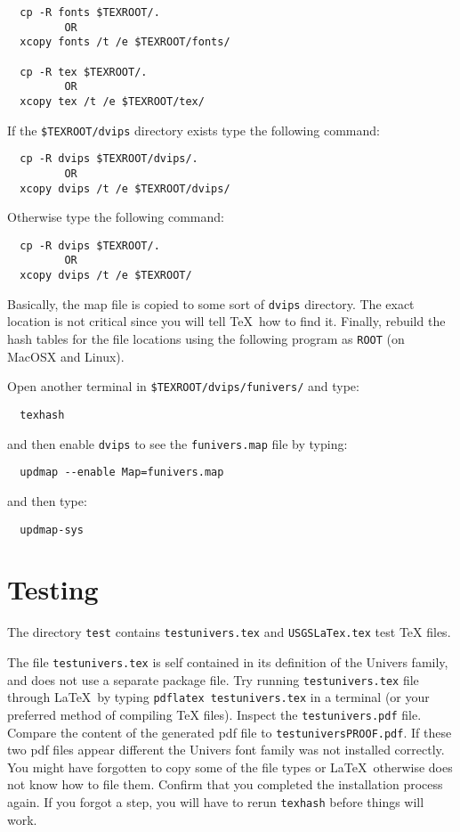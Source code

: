 \documentclass[11pt]{article}
\begin{document}
\begin{verbatim}
  cp -R fonts $TEXROOT/. 
         OR 
  xcopy fonts /t /e $TEXROOT/fonts/

  cp -R tex $TEXROOT/.
         OR 
  xcopy tex /t /e $TEXROOT/tex/
\end{verbatim}

If the \texttt{\$TEXROOT/dvips} directory exists type the following command: 

\begin{verbatim}
  cp -R dvips $TEXROOT/dvips/.  
         OR
  xcopy dvips /t /e $TEXROOT/dvips/
\end{verbatim}

Otherwise type the following command:

\begin{verbatim}
  cp -R dvips $TEXROOT/.
         OR
  xcopy dvips /t /e $TEXROOT/
\end{verbatim}

Basically, the map file is copied to some sort of \texttt{dvips} directory. The exact location is not critical since you will tell \TeX\ how to find it. Finally, rebuild the hash tables for the file locations using the following program as \texttt{ROOT} (on MacOSX and Linux).

Open another terminal in \texttt{\$TEXROOT/dvips/funivers/} and type:

\begin{verbatim}
  texhash
\end{verbatim}

\noindent and then enable \texttt{dvips} to see the \texttt{funivers.map} file by typing:
\begin{verbatim}
  updmap --enable Map=funivers.map
\end{verbatim}

and then type:

\begin{verbatim}
  updmap-sys
\end{verbatim}


\section*{\textsf{Testing}}

The directory \texttt{test} contains \texttt{testunivers.tex} and \texttt{USGSLaTex.tex} test \TeX \hspace{1pt} files. 

The file \texttt{testunivers.tex} is self contained in its definition of the Univers family, and does not use a separate package file. Try running \texttt{testunivers.tex} file through \LaTeX\ by typing \texttt{pdflatex testunivers.tex} in a terminal (or your preferred method of compiling  \TeX \hspace{1pt} files). Inspect the \texttt{testunivers.pdf} file. Compare the content of the generated \textsf{pdf} file to \texttt{testuniversPROOF.pdf}. If these two \textsf{pdf} files appear different the Univers font family was not installed correctly. You might have forgotten to copy some of the file types or \LaTeX\ otherwise does not know how to file them. Confirm that you completed the installation process again. If you forgot a step, you will have to rerun \texttt{texhash} before things will work.
\end{document}
